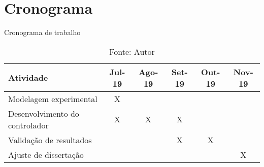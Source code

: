 \chapter{Cronograma}
\label{ch:cronograma}

\begin{table}[h]
	\centering
	\caption{Cronograma de trabalho}
	\label{tab:cronograma}
	\begin{tabular}{lccccc} \toprule
		{Atividade} 	                & {Jul-19}	& {Ago-19}	& {Set-19}  & {Out-19}  & {Nov-19}  \\ \midrule
        Modelagem experimental          & X         &           &           &           &           \\
        Desenvolvimento do controlador  & X         & X         & X         &           &           \\
        Validação de resultados         &           &           & X         & X         &           \\
        Ajuste de dissertação           &           &           &           &           & X        	\\ \bottomrule
	\end{tabular}
	\caption*{Fonte: Autor}
\end{table}